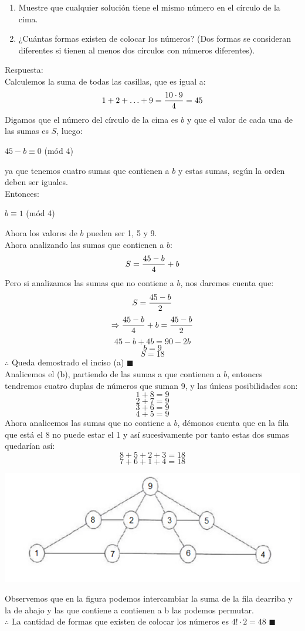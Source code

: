 \documentclass{book}
\begin{document}
\begin{enumerate}
\begin{enumerate}
            \item Muestre que cualquier solución tiene el mismo número en el círculo de la cima.
            \item ¿Cuántas formas existen de colocar los números? (Dos formas se consideran diferentes si tienen al menos dos círculos con números diferentes).
        \end{enumerate}
        Respuesta:\\
        Calculemos la suma de todas las casillas, que es igual a:
        $$1+2+\ldots +9={10\cdot 9\over 4}=45$$
        Digamos que el número del círculo de la cima es $b$ y que el valor de cada una de las sumas es $S$, luego:
        \begin{center}
            $45-b\equiv 0$ (mód 4)
        \end{center}
        ya que tenemos cuatro sumas que contienen a $b$ y estas sumas, según la orden deben ser iguales.\\
        Entonces:
        \begin{center}
            $b\equiv 1$ (mód 4)
        \end{center}
        Ahora los valores de $b$ pueden ser 1, 5 y 9.\\
        Ahora analizando las sumas que contienen a $b$:
        $$S={45-b\over 4}+b$$
        Pero si analizamos las sumas que no contiene a $b$, nos daremos cuenta que:
        $$S={45-b\over 2}$$
        $$\Rightarrow {45-b\over 4}+b={45-b\over 2}$$
        $$45-b+4b=90-2b$$
        $$b=9$$
        $$S=18$$
        $\therefore$ Queda demostrado el inciso (a) $\blacksquare$\\
        Analicemos el (b), partiendo de las sumas a que contienen a $b$, entonces tendremos cuatro duplas de números que suman 9, y las únicas posibilidades son:
        $$1+8=9$$
        $$2+7=9$$
        $$3+6=9$$
        $$4+5=9$$
        Ahora analicemos las sumas que no contiene a $b$, démonos cuenta que en la fila que está el 8 no puede estar el 1 y así sucesivamente por tanto estas dos sumas quedarían así:
        $$8+5+2+3=18$$
        $$7+6+1+4=18$$
        \begin{center}
            \includegraphics[scale=1]{imagenes/Combinatoria/1,2.png}
        \end{center}
        Observemos que en la figura podemos intercambiar la suma de la fila dearriba y la de abajo y las que contiene a contienen a b las podemos permutar.\\
        $\therefore$ La cantidad de formas que existen de colocar los números es $4!\cdot 2=48$ $\blacksquare$\\


\end{enumerate}
\end{document}
